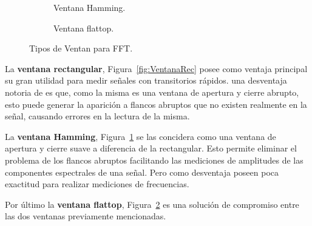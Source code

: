 \begin{figure}[H]
\begin{subfigure}[H]{0.45\textwidth}
            \caption{Ventana Hamming.}
            \label{fig:VentanaHamming}
            \end{subfigure}
            \hfill 
            \begin{subfigure}[H]{0.45\textwidth}
            \caption{Ventana flattop.}
            \label{fig:VentanaFlattop}
            \end{subfigure}

            \caption{Tipos de Ventan para FFT.}
            \label{fig:VentanasTipos}
        \end{figure}
    
    La \textbf{ventana rectangular}, Figura~\ref{fig:VentanaRec} posee como ventaja principal su 
    gran utilidad para medir señales con transitorios rápidos. una desventaja notoria de 
    es que, como la misma es una ventana de apertura y cierre abrupto, esto puede 
    generar la aparición a flancos abruptos que no existen realmente en la señal, causando 
    errores en la lectura de la misma.
    
    La \textbf{ventana Hamming}, Figura~\ref{fig:VentanaHamming} se las concidera como una ventana de 
    apertura y cierre suave a diferencia de la rectangular. Esto permite eliminar el problema
    de los flancos abruptos facilitando las mediciones de amplitudes de las componentes 
    espectrales de una señal. Pero como desventaja poseen poca exactitud para realizar 
    mediciones de frecuencias.
    
    Por último la \textbf{ventana flattop}, Figura~\ref{fig:VentanaFlattop} es una solución de compromiso
    entre las dos ventanas previamente mencionadas. 

